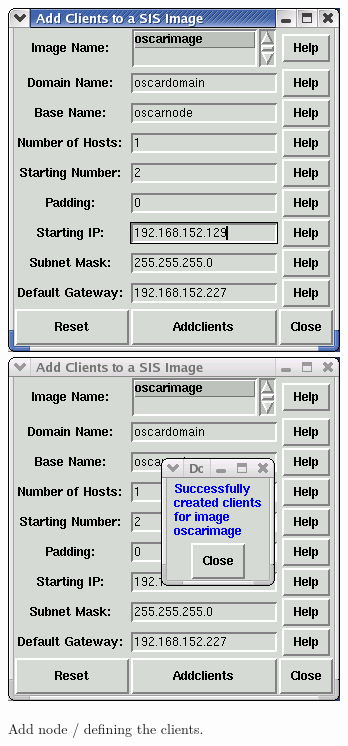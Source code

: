 \begin{figure}[!htb]
  \begin{center}
    \centerline{
      \includegraphics[scale=\imgscale]{figs/9b_sbs-add-node-mksirange}
      \hspace{\imghskip}
      \includegraphics[scale=\imgscale]{figs/9c_sbs-add-node-success}
      }
    \caption{Add node / defining the clients.}
    \label{fig:sbs-add-node1-define-clients}
  \end{center}
\end{figure}

